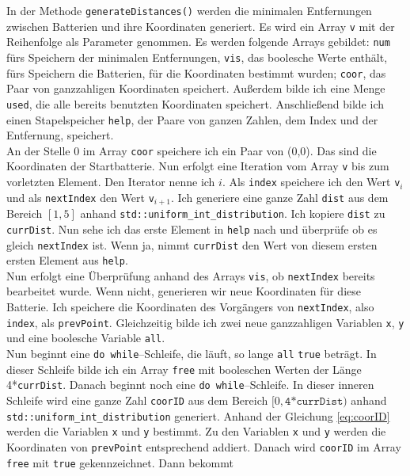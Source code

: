 \documentclass[a4paper,10pt,ngerman]{scrartcl}
\begin{document}
In der Methode \texttt{generateDistances()} werden die minimalen Entfernungen zwischen Batterien und ihre Koordinaten generiert.
Es wird ein Array \texttt{v} mit der Reihenfolge als Parameter genommen.
Es werden folgende Arrays gebildet: \texttt{num} fürs Speichern der minimalen Entfernungen, \texttt{vis}, das boolesche Werte
enthält, fürs Speichern die Batterien, für die Koordinaten bestimmt wurden; \texttt{coor}, das Paar von
ganzzahligen Koordinaten speichert.
Außerdem bilde ich eine Menge \texttt{used}, die alle bereits benutzten Koordinaten speichert.
Anschließend bilde ich einen Stapelspeicher \texttt{help}, der Paare von ganzen Zahlen, dem Index und der Entfernung, speichert.\\
An der Stelle 0 im Array \texttt{coor} speichere ich ein Paar von (0,0). Das sind die Koordinaten der Startbatterie.
Nun erfolgt eine Iteration vom Array \texttt{v} bis zum vorletzten Element. Den Iterator nenne ich $i$.
Als \texttt{index} speichere ich den Wert \texttt{v}$_i$ und als \texttt{nextIndex} den Wert \texttt{v}$_{i+1}$.
Ich generiere eine ganze Zahl \texttt{dist} aus dem Bereich $[1,5]$ anhand \texttt{std::uniform\_int\_distribution}.
Ich kopiere \texttt{dist} zu \texttt{currDist}. Nun sehe ich das erste Element in \texttt{help} nach und überprüfe
ob es gleich \texttt{nextIndex} ist. Wenn ja, nimmt \texttt{currDist} den Wert von diesem ersten ersten Element aus \texttt{help}.\\
Nun erfolgt eine Überprüfung anhand des Arrays \texttt{vis}, ob \texttt{nextIndex} bereits bearbeitet wurde.
Wenn nicht, generieren wir neue Koordinaten für diese Batterie.
Ich speichere die Koordinaten des Vorgängers von \texttt{nextIndex}, also \texttt{index}, als \texttt{prevPoint}.
Gleichzeitig bilde ich zwei neue ganzzahligen Variablen
\texttt{x}, \texttt{y} und eine boolesche Variable \texttt{all}.\\
Nun beginnt eine \texttt{do while}--Schleife, die läuft, so lange \texttt{all} \texttt{true} beträgt.
In dieser Schleife bilde ich ein Array \texttt{free} mit booleschen Werten der Länge 4*\texttt{currDist}.
Danach beginnt noch eine \texttt{do while}--Schleife. In dieser inneren Schleife wird
eine ganze Zahl \texttt{coorID} aus dem Bereich $[0, \texttt{4*currDist})$ anhand \texttt{std::uniform\_int\_distribution} generiert.
Anhand der Gleichung \ref{eq:coorID} werden die Variablen \texttt{x} und \texttt{y} bestimmt.
Zu den Variablen \texttt{x} und \texttt{y} werden die Koordinaten von \texttt{prevPoint} entsprechend addiert.
Danach wird \texttt{coorID} im Array \texttt{free} mit \texttt{true} gekennzeichnet. Dann bekommt 
\end{document}
